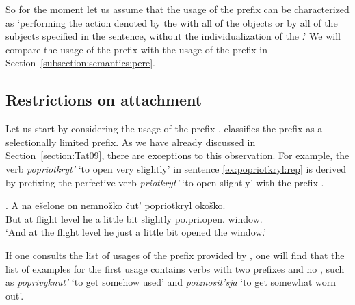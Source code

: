 So for the moment let us assume that the  usage of the prefix  can be characterized as `performing the action denoted by the  with all of the objects or by all of the subjects specified in the sentence, without the individualization of the .' We will compare the  usage of the prefix  with the  usage of the prefix  in Section~\ref{subsection:semantics:pere}.

\subsection{Restrictions on attachment} 
Let us start by considering the  usage of the prefix . \citet{Tatevosov:09} classifies the  prefix  as a selectionally limited prefix. As we have already discussed in Section~\ref{section:Tat09}, there are exceptions to this observation. For example, the verb \textit{popriotkryt'} `to open very slightly' in sentence \ref{ex:popriotkryl:rep} is derived by prefixing the perfective verb \textit{priotkryt'} `to open slightly' with the  prefix .

\exg. \label{ex:popriotkryl:rep}A na e\v{s}elone on nemno\v{z}ko \v{c}ut' popriotkryl oko\v{s}ko.\\
But at {flight level} he {a little bit} {slightly} po.pri.open. window.\\
\trans `And at the flight level he just a little bit opened the window.'\\

If one consults the list of usages of the prefix  provided by \citet{Shvedova:82}, one will find that the list of examples for the first usage contains verbs with two prefixes and no , such as \textit{poprivyknut'} `to get somehow used' and \textit{poiznosit'sja} `to get somewhat worn out'. 


